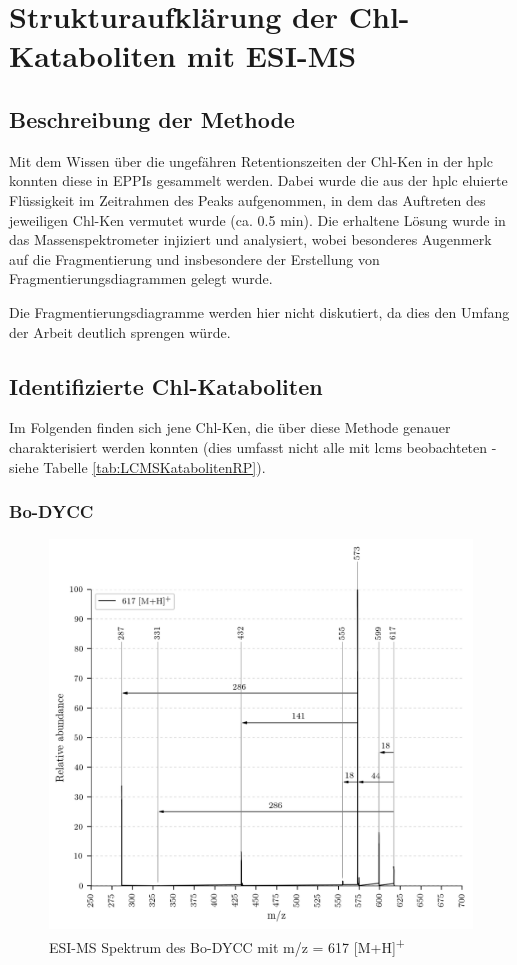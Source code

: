 \chapter{Strukturaufklärung der Chl-Kataboliten mit ESI-MS} \label{sec:ChlKatabolitenESIMS}

\section{Beschreibung der Methode}

Mit dem Wissen über die ungefähren Retentionszeiten der \gls{Chl-K}en in der \gls{hplc} konnten diese in EPPIs gesammelt werden. Dabei wurde die aus der \gls{hplc} eluierte Flüssigkeit im Zeitrahmen des Peaks aufgenommen, in dem das Auftreten des jeweiligen \gls{Chl-K}en vermutet wurde (ca. 0.5 min). Die erhaltene Lösung wurde in das Massenspektrometer injiziert und analysiert, wobei besonderes Augenmerk auf die Fragmentierung und insbesondere der Erstellung von Fragmentierungsdiagrammen gelegt wurde. 

Die Fragmentierungsdiagramme werden hier nicht diskutiert, da dies den Umfang der Arbeit deutlich sprengen würde. 

\section{Identifizierte Chl-Kataboliten}

Im Folgenden finden sich jene \gls{Chl-K}en, die über diese Methode genauer charakterisiert werden konnten (dies umfasst nicht alle mit \gls{lcms} beobachteten - siehe Tabelle \ref{tab:LCMSKatabolitenRP}). 

\subsection{Bo-DYCC}

\begin{figure}[!htbp]
  \centering
  \includegraphics[width=\textwidth, height=0.6\textwidth]{figures/Kapitel7/Kataboliten/VWA_MS_617.png}
  \caption[ESI-MS Spektrum des Bo-DYCC, Quelle: Autor]{ESI-MS Spektrum des Bo-DYCC mit m/z = 617 [M+H]\textsuperscript{+}}
  \label{fig:617MH}
\end{figure}

